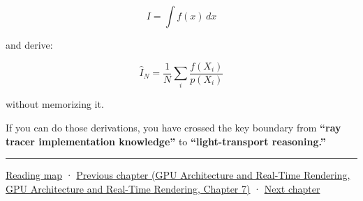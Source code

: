 \[
I=\int f(x)\,dx
\]

and derive:

\[
\boxed{
\hat I_N
=
\frac1N
\sum_i
\frac{f(X_i)}{p(X_i)}
}
\]

without memorizing it.

If you can do those derivations, you have crossed the key boundary from \textbf{``ray tracer implementation knowledge''} to \textbf{``light-transport reasoning.''}

\begin{center}\rule{0.5\linewidth}{0.5pt}\end{center}

\hyperref[volume-reading-map]{Reading map} · \href{../06-GPU-Architecture-and-Real-Time-Rendering/main.pdf\#nameddest=03-visual-computing-i-ch006-from-material-data-to-gpu-bindings}{Previous chapter (GPU Architecture and Real-Time Rendering, GPU Architecture and Real-Time Rendering, Chapter 7)} · \hyperref[03-visual-computing-i-ch008-sampling-directions-and-light-transport]{Next chapter}
